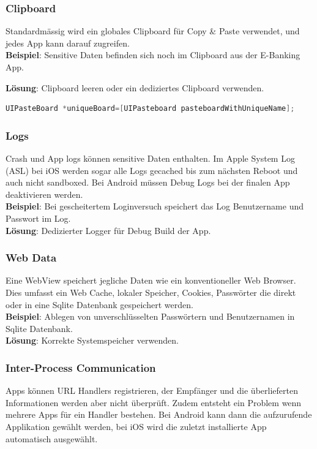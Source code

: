 \subsubsection{Clipboard}
Standardmässig wird ein globales Clipboard für Copy \& Paste verwendet, und jedes App kann darauf zugreifen. \\
\textbf{Beispiel}: Sensitive Daten befinden sich noch im Clipboard aus der E-Banking App.

\textbf{Lösung}: Clipboard leeren oder ein dediziertes Clipboard verwenden.
\begin{lstlisting}[language=C, caption=Lösung für iOS]
UIPasteBoard *uniqueBoard=[UIPasteboard pasteboardWithUniqueName];
\end{lstlisting}

\subsubsection{Logs}
Crash und App logs können sensitive Daten enthalten. Im Apple System Log (ASL) bei iOS werden sogar alle Logs gecached bis zum nächsten Reboot und auch nicht sandboxed. Bei Android müssen Debug Logs bei der finalen App deaktivieren werden. \\

\textbf{Beispiel}: Bei gescheitertem Loginversuch speichert das Log Benutzername und Passwort im Log. \\

\textbf{Lösung}: Dedizierter Logger für Debug Build der App.

\subsubsection{Web Data}
Eine WebView speichert jegliche Daten wie ein konventioneller Web Browser. Dies umfasst ein Web Cache, lokaler Speicher, Cookies, Passwörter die direkt oder in eine Sqlite Datenbank gespeichert werden. \\

\textbf{Beispiel}: Ablegen von unverschlüsselten Passwörtern und Benutzernamen in Sqlite Datenbank.\\

\textbf{Lösung}: Korrekte Systemspeicher verwenden.

\subsubsection{Inter-Process Communication}
Apps können URL Handlers registrieren, der Empfänger und die überlieferten Informationen werden aber nicht überprüft. Zudem entsteht ein Problem wenn mehrere Apps für ein Handler bestehen. Bei Android kann dann die aufzurufende Applikation gewählt werden, bei iOS wird die zuletzt installierte App automatisch ausgewählt.\\

